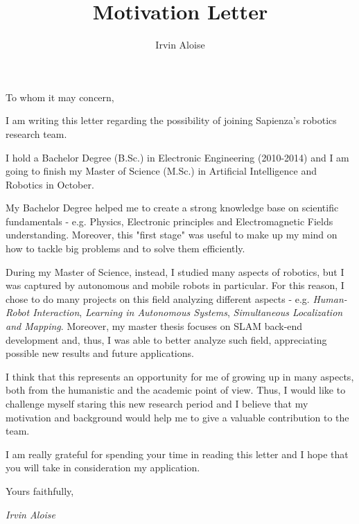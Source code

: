 \documentclass[12pt,a4paper, notitlepage]{report}
\title{Motivation Letter}
\author{Irvin Aloise}
\date{}
\begin{document}
To whom it may concern, \\

\vspace{10px}

I am writing this letter regarding the possibility of joining Sapienza's robotics research team.

I hold a Bachelor Degree (B.Sc.) in Electronic Engineering (2010-2014) and I am going to finish my Master of Science (M.Sc.) in Artificial Intelligence and Robotics in October. 

My Bachelor Degree helped me to create a strong knowledge base on scientific fundamentals - e.g. Physics, Electronic principles and Electromagnetic Fields understanding. Moreover, this "first stage" was useful to make up my mind on how to tackle big problems and to solve them efficiently.

During my Master of Science, instead, I studied many aspects of robotics, but I was captured by autonomous and mobile robots in particular. For this reason, I chose to do many projects on this field analyzing different aspects - e.g. \textit{Human-Robot Interaction}, \textit{Learning in Autonomous Systems}, \textit{Simultaneous Localization and Mapping}. Moreover, my master thesis focuses on SLAM back-end development and, thus, I was able to better analyze such field, appreciating possible new results and future applications.

I think that this represents an opportunity for me of growing up in many aspects, both from the humanistic and the academic point of view. Thus, I would like to challenge myself staring this new research period and I believe that my motivation and background would help me to give a valuable contribution to the team. 

\vspace{5px}

I am really grateful for spending your time in reading this letter and I hope that you will take in consideration my application.

\vspace{20px}
Yours faithfully,
\vspace{5px}

\begin{flushright}
    \textit{Irvin Aloise}
\end{flushright}
\end{document}
